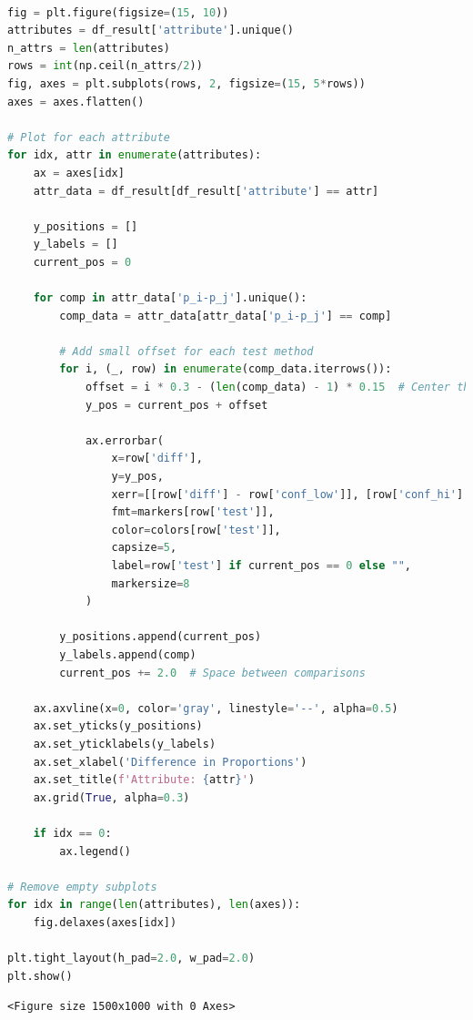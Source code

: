 \begin{lstlisting}[language=Python]

fig = plt.figure(figsize=(15, 10))
attributes = df_result['attribute'].unique()
n_attrs = len(attributes)
rows = int(np.ceil(n_attrs/2))
fig, axes = plt.subplots(rows, 2, figsize=(15, 5*rows))
axes = axes.flatten()

# Plot for each attribute
for idx, attr in enumerate(attributes):
    ax = axes[idx]
    attr_data = df_result[df_result['attribute'] == attr]
    
    y_positions = []
    y_labels = []
    current_pos = 0
    
    for comp in attr_data['p_i-p_j'].unique():
        comp_data = attr_data[attr_data['p_i-p_j'] == comp]
        
        # Add small offset for each test method
        for i, (_, row) in enumerate(comp_data.iterrows()):
            offset = i * 0.3 - (len(comp_data) - 1) * 0.15  # Center the methods
            y_pos = current_pos + offset
            
            ax.errorbar(
                x=row['diff'],
                y=y_pos,
                xerr=[[row['diff'] - row['conf_low']], [row['conf_hi'] - row['diff']]],
                fmt=markers[row['test']],
                color=colors[row['test']],
                capsize=5,
                label=row['test'] if current_pos == 0 else "",
                markersize=8
            )
            
        y_positions.append(current_pos)
        y_labels.append(comp)
        current_pos += 2.0  # Space between comparisons
    
    ax.axvline(x=0, color='gray', linestyle='--', alpha=0.5)
    ax.set_yticks(y_positions)
    ax.set_yticklabels(y_labels)
    ax.set_xlabel('Difference in Proportions')
    ax.set_title(f'Attribute: {attr}')
    ax.grid(True, alpha=0.3)
    
    if idx == 0:
        ax.legend()

# Remove empty subplots
for idx in range(len(attributes), len(axes)):
    fig.delaxes(axes[idx])

plt.tight_layout(h_pad=2.0, w_pad=2.0)
plt.show()
\end{lstlisting}

\begin{lstlisting}
<Figure size 1500x1000 with 0 Axes>
\end{lstlisting}

